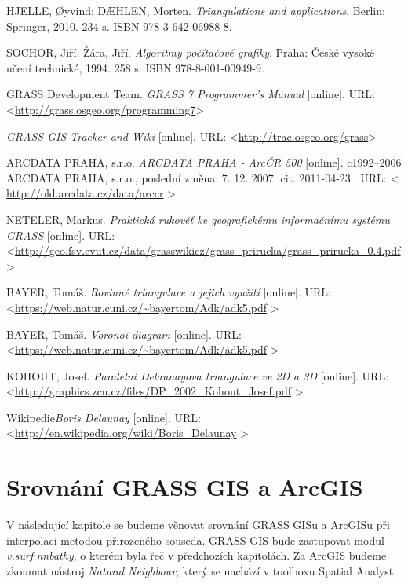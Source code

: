\documentclass[12pt,a4paper]{article}
\begin{document}
\begin{thebibliography}{99}
\label{literatura}


HJELLE, Øyvind; DÆHLEN, Morten. \textit{Triangulations and applications}. Berlin: Springer, 2010. 234 s. ISBN 978-3-642-06988-8.


SOCHOR, Jiří; Žára, Jiří. \textit{Algoritmy počítačové grafiky}. Praha: České vysoké učení technické, 1994. 258 s. ISBN 978-8-001-00949-9.


GRASS Development Team. \textit{GRASS 7 Programmer's Manual} [online].
URL: \textless\url{http://grass.osgeo.org/programming7}\textgreater


\textit{GRASS GIS Tracker and Wiki} [online]. 
URL: \textless\url{http://trac.osgeo.org/grass}\textgreater


ARCDATA PRAHA, s.r.o. \textit{ARCDATA PRAHA - ArcČR 500} [online].
c1992–2006 ARCDATA PRAHA, s.r.o., poslední změna: 7. 12. 2007 [cit. 2011-04-23].
URL: \textless
\url{http://old.arcdata.cz/data/arccr} \textgreater

NETELER, Markus. \textit{Praktická rukověť ke geografickému informačnímu systému GRASS} [online].
URL: \textless\url{http://geo.fsv.cvut.cz/data/grasswikicz/grass_prirucka/grass_prirucka_0.4.pdf}
\textgreater

BAYER, Tomáš. \textit{Rovinné triangulace a jejich využití} [online].
URL: \textless\url{https://web.natur.cuni.cz/~bayertom/Adk/adk5.pdf}
\textgreater

BAYER, Tomáš. \textit{Voronoi diagram} [online].
URL: \textless\url{https://web.natur.cuni.cz/~bayertom/Adk/adk5.pdf}
\textgreater

KOHOUT, Josef. \textit{Paralelní Delaunayova triangulace
ve 2D a 3D} [online].
URL: \textless\url{http://graphics.zcu.cz/files/DP_2002_Kohout_Josef.pdf}
\textgreater

Wikipedie\textit{Boris Delaunay} [online].
URL: \textless\url{http://en.wikipedia.org/wiki/Boris_Delaunay}
\textgreater

\end{thebibliography}

\appendix
\newpage
\section{Srovnání GRASS GIS a ArcGIS}

V následující kapitole se budeme věnovat srovnání GRASS GISu a ArcGISu při interpolaci metodou přirozeného souseda. GRASS GIS bude zastupovat modul \emph{v.surf.nnbathy}, o kterém byla řeč v předchozích kapitolách. Za ArcGIS budeme zkoumat nástroj \emph{Natural Neighbour}, který se nachází v toolboxu Spatial Analyst. 
\end{document}
